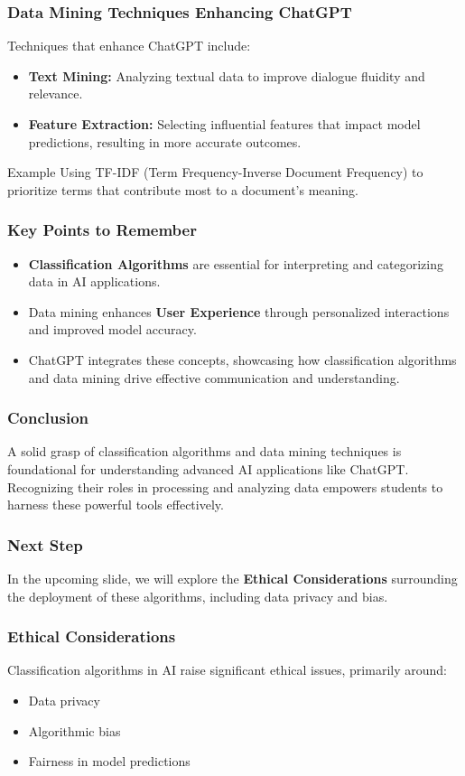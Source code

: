 \documentclass[aspectratio=169]{beamer}
\begin{document}
\begin{frame}[fragile]
    \frametitle{Data Mining Techniques Enhancing ChatGPT}
    Techniques that enhance ChatGPT include:
    \begin{itemize}
        \item \textbf{Text Mining:} Analyzing textual data to improve dialogue fluidity and relevance.
        \item \textbf{Feature Extraction:} Selecting influential features that impact model predictions, resulting in more accurate outcomes.
    \end{itemize}
    \begin{block}{Example}
        Using TF-IDF (Term Frequency-Inverse Document Frequency) to prioritize terms that contribute most to a document's meaning.
    \end{block}
\end{frame}

\begin{frame}[fragile]
    \frametitle{Key Points to Remember}
    \begin{itemize}
        \item \textbf{Classification Algorithms} are essential for interpreting and categorizing data in AI applications.
        \item Data mining enhances \textbf{User Experience} through personalized interactions and improved model accuracy.
        \item ChatGPT integrates these concepts, showcasing how classification algorithms and data mining drive effective communication and understanding.
    \end{itemize}
\end{frame}

\begin{frame}[fragile]
    \frametitle{Conclusion}
    A solid grasp of classification algorithms and data mining techniques is foundational for understanding advanced AI applications like ChatGPT. Recognizing their roles in processing and analyzing data empowers students to harness these powerful tools effectively.
\end{frame}

\begin{frame}[fragile]
    \frametitle{Next Step}
    In the upcoming slide, we will explore the \textbf{Ethical Considerations} surrounding the deployment of these algorithms, including data privacy and bias.
\end{frame}

\begin{frame}[fragile]
    \frametitle{Ethical Considerations}
    Classification algorithms in AI raise significant ethical issues, primarily around:
    \begin{itemize}
        \item Data privacy
        \item Algorithmic bias
        \item Fairness in model predictions
    \end{itemize}
\end{frame}
\end{document}
